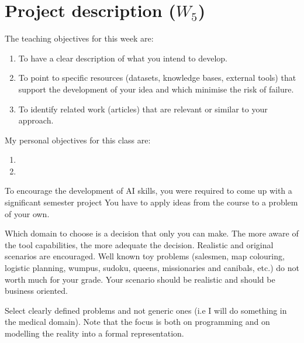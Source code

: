 \documentclass[a4paper,12pt]{report}
\begin{document}
\vspace{0.5cm}

\vspace{0.5cm}



\chapter{Project description ($W_5$)}

The teaching objectives for this week are:
\begin{enumerate}
 \item To have a clear description of what you intend to develop.
\item To point to specific resources (datasets, knowledge bases, external tools) 
that support the development of your idea and which minimise the risk of failure.
\item To identify related work (articles) that are relevant or similar to your approach.
\end{enumerate}

\vspace{0.5cm}

My personal objectives for this class are:
\begin{enumerate}
 \item 
 \item 
\end{enumerate}


To encourage the development of AI skills, 
you  were required to come up with a significant semester project 
You have to  apply ideas from the course to a problem of your own.

Which domain to choose is a decision that only you can make. 
The more aware of the tool capabilities, the more adequate the decision.
Realistic and original scenarios are encouraged. 
Well known toy problems (salesmen, map colouring, logistic planning, wumpus, sudoku, queens, missionaries and canibals, etc.) do not worth much for your grade. 
Your scenario should be realistic and should be business oriented. 

Select clearly defined problems and not generic ones 
(i.e I will do something in the medical domain). 
Note that the focus is both on programming and on modelling the reality into a formal representation.
\end{document}
